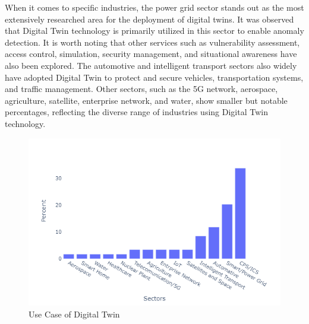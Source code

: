 When it comes to specific industries, the power grid sector stands out as the most extensively researched area for the deployment of digital twins. It was observed that Digital Twin technology is primarily utilized in this sector to enable anomaly detection. It is worth noting that other services such as vulnerability assessment, access control, simulation, security management, and situational awareness have also been explored. The automotive and intelligent transport sectors also widely have adopted Digital Twin to protect and secure vehicles, transportation systems, and traffic management. Other sectors, such as the 5G network, aerospace, agriculture, satellite, enterprise network, and water, show smaller but notable percentages, reflecting the diverse range of industries using Digital Twin technology. 

\begin{figure}[H]    
    \includegraphics[width=1\textwidth]{images/rt/dt-sector.png}
    \caption{Use Case of Digital Twin}
    \label{fig:sector}
\end{figure}




